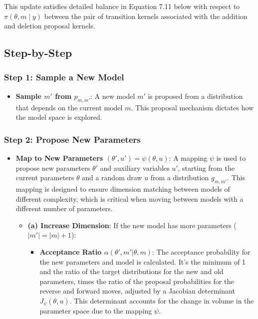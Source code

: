 \documentclass[10pt]{article}
\begin{document}
This update satisfies detailed balance in Equation 7.11 below with respect to $\pi(\theta, m \mid y)$ between the pair of transition kernels associated with the addition and deletion proposal kernels.

\subsection*{Step-by-Step}

\subsubsection*{Step 1: Sample a New Model}
\begin{itemize}
  \item \textbf{Sample \( m' \) from \( p_{m,m'} \)}: A new model \( m' \) is proposed from a distribution that depends on the current model \( m \). This proposal mechanism dictates how the model space is explored.
\end{itemize}

\subsubsection*{Step 2: Propose New Parameters}
\begin{itemize}
  \item \textbf{Map to New Parameters \( (\theta', u') = \psi(\theta, u) \)}: A mapping \( \psi \) is used to propose new parameters \( \theta' \) and auxiliary variables \( u' \), starting from the current parameters \( \theta \) and a random draw \( u \) from a distribution \( g_{m,m'} \). This mapping is designed to ensure dimension matching between models of different complexity, which is critical when moving between models with a different number of parameters.

  \begin{itemize}
    \item \textbf{(a) Increase Dimension}: If the new model has more parameters (\( |m'| = |m| + 1 \)):
    \begin{itemize}
      \item \textbf{Acceptance Ratio \( \alpha(\theta', m'|\theta, m) \)}: The acceptance probability for the new parameters and model is calculated. It's the minimum of 1 and the ratio of the target distributions for the new and old parameters, times the ratio of the proposal probabilities for the reverse and forward moves, adjusted by a Jacobian determinant \( J_{\psi}(\theta, u) \). This determinant accounts for the change in volume in the parameter space due to the mapping \( \psi \).
    \end{itemize}
  \end{itemize}
\end{itemize}
\end{document}
